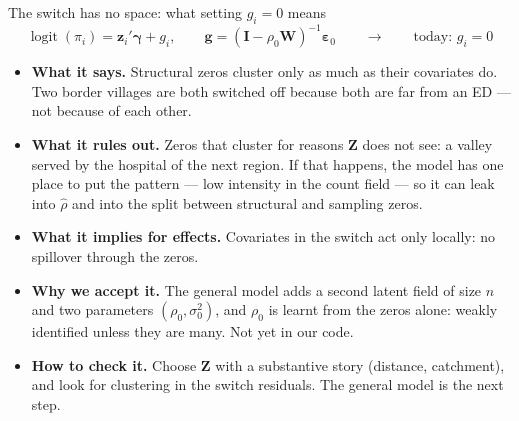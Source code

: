 \documentclass[10pt,aspectratio=169]{beamer}
\newcommand{\bW}{\mathbf{W}}
\newcommand{\bZ}{\mathbf{Z}}
\newcommand{\bI}{\mathbf{I}}
\newcommand{\bgamma}{\boldsymbol{\gamma}}
\DeclareMathOperator{\logit}{logit}
\begin{document}
\begin{frame}{The switch has no space: what setting $g_i=0$ means}
  \small
  \[
    \logit(\pi_i) = \mathbf z_i'\bgamma + g_i, \qquad \mathbf g = (\bI-\rho_0\bW)^{-1}\boldsymbol\varepsilon_0
    \qquad\longrightarrow\qquad \text{today: } g_i = 0
  \]
  \begin{itemize}\setlength{\itemsep}{0.55em}
    \item \textbf{What it says.} Structural zeros cluster only as much as their covariates do. Two border villages are both switched off because both are far from an ED --- not because of each other.
    \item \textbf{What it rules out.} Zeros that cluster for reasons $\bZ$ does not see: a valley served by the hospital of the next region. If that happens, the model has one place to put the pattern --- low intensity in the count field --- so it can leak into $\hat\rho$ and into the split between structural and sampling zeros.
    \item \textbf{What it implies for effects.} Covariates in the switch act only locally: no spillover through the zeros.
    \item \textbf{Why we accept it.} The general model adds a second latent field of size $n$ and two parameters $(\rho_0,\sigma_0^2)$, and $\rho_0$ is learnt from the zeros alone: weakly identified unless they are many. Not yet in our code.
    \item \textbf{How to check it.} Choose $\bZ$ with a substantive story (distance, catchment), and look for clustering in the switch residuals. The general model is the next step.
  \end{itemize}
\end{frame}
\end{document}
